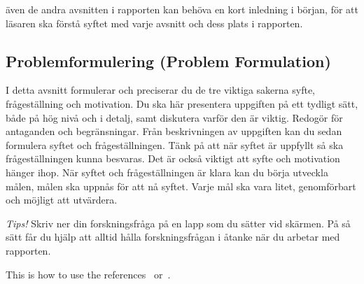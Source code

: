 även de andra avsnitten i rapporten kan behöva en kort inledning i början, för att läsaren ska förstå syftet med varje avsnitt och dess plats i rapporten.


\subsection{Problemformulering (Problem Formulation)} 

I detta avsnitt formulerar och preciserar du de tre viktiga sakerna syfte, frågeställning och motivation. Du ska här presentera uppgiften på ett tydligt sätt, både på hög nivå och i detalj, samt diskutera varför den är viktig. Redogör för antaganden och begränsningar. Från beskrivningen av uppgiften kan du sedan formulera syftet och frågeställningen. Tänk på att när syftet är uppfyllt så ska frågeställningen kunna besvaras. Det är också viktigt att syfte och motivation hänger ihop. När syftet och frågeställningen är klara kan du börja utveckla målen, målen ska uppnås för att nå syftet. Varje mål ska vara litet, genomförbart och möjligt att utvärdera.  


\emph{Tips!} Skriv ner din forskningsfråga på en lapp som du sätter vid skärmen. På så sätt får du hjälp att alltid hålla forskningsfrågan i åtanke när du arbetar med rapporten.

This is how to use the references~\cite{Berndtsson607210, Blomkvist2014} or~\cite{Turing1950}.



